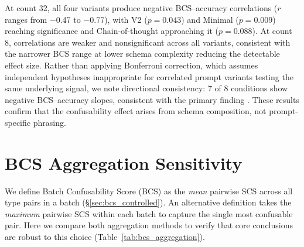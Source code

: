 \documentclass[11pt]{article}
\begin{document}
At count 32, all four variants produce negative BCS--accuracy correlations ($r$ ranges from $-$0.47 to $-$0.77), with V2 ($p = 0.043$) and Minimal ($p = 0.009$) reaching significance and Chain-of-thought approaching it ($p = 0.088$). At count 8, correlations are weaker and nonsignificant across all variants, consistent with the narrower BCS range at lower schema complexity reducing the detectable effect size. Rather than applying Bonferroni correction, which assumes independent hypotheses inappropriate for correlated prompt variants testing the same underlying signal, we note directional consistency: 7 of 8 conditions show negative BCS--accuracy slopes, consistent with the primary finding \citep{rothman-1990}. These results confirm that the confusability effect arises from schema composition, not prompt-specific phrasing.

\section{BCS Aggregation Sensitivity}
\label{sec:appendix_bcs_sensitivity}

We define Batch Confusability Score (BCS) as the \emph{mean} pairwise SCS across all type pairs in a batch (\S\ref{sec:bcs_controlled}). An alternative definition takes the \emph{maximum} pairwise SCS within each batch to capture the single most confusable pair. Here we compare both aggregation methods to verify that core conclusions are robust to this choice (Table~\ref{tab:bcs_aggregation}).

\begin{table}[h]
\centering
\small
\caption{BCS--accuracy regression under mean vs.\ max pairwise SCS aggregation (FewRel, 16-relation batches). Permutation test for slope equivalence across pools: MEAN $p \approx 0.60$; MAX $p \approx 0.44$. The 80-pool row is identical under both definitions because these batches were collected using mean-aggregated BCS; the MAX column reflects the same data for completeness.}
\label{tab:bcs_aggregation}
\end{table}
\end{document}
